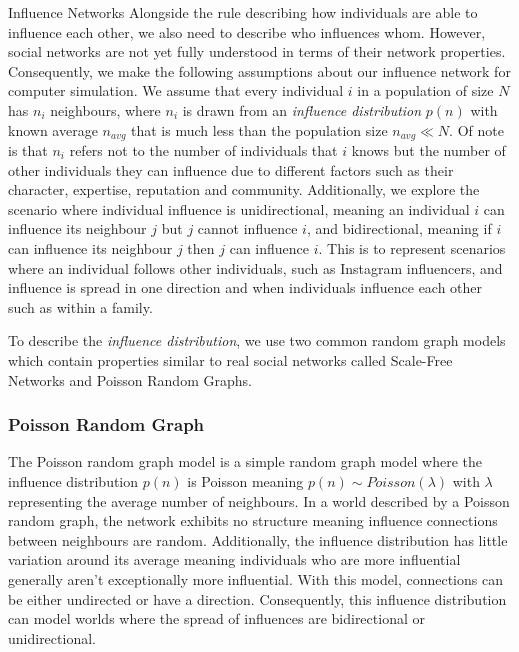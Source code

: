 \documentclass[10pt, oneside, reqno]{amsart}
\makeatletter
\theoremstyle{plain}%
\theoremstyle{definition}
\theoremstyle{remark}
\renewcommand\subsection{\@startsection{subsection}{2}%
  \z@{.5\linespacing\@plus.7\linespacing}{-.5em}%
  {\normalfont\scshape}}
\makeatother
\begin{document}
\subsection{Influence Networks}
Alongside the rule describing how individuals are able to influence each other, we also need to 
describe who influences whom.
However, social networks are not yet fully understood in terms of their network properties. 
Consequently, we make the following assumptions about our influence network for computer 
simulation.
We assume that every individual $i$ in a population of size $N$ has $n_i$ neighbours, where 
$n_i$ is drawn from an \textit{influence distribution} $p(n)$ with known average $n_{avg}$ that is much less 
than the population size $n_{avg} \ll N$.
Of note is that $n_i$ refers not to the number of individuals that $i$ knows but the number of 
other individuals they can influence due to different factors such as their character, expertise, reputation and community.
Additionally, we explore the scenario where individual influence is unidirectional, meaning 
an individual $i$ can influence its neighbour $j$ but $j$ cannot influence $i$, and 
bidirectional, meaning if $i$ can influence its neighbour $j$ then $j$ can influence $i$. 
This is to represent scenarios where an individual follows other individuals, such as Instagram 
influencers, and influence is spread in one direction and when individuals influence each 
other such as within a family.

To describe the \textit{influence distribution}, we use two common random graph models 
which contain properties similar to real social networks called Scale-Free Networks and 
Poisson Random Graphs.


\subsubsection{Poisson Random Graph}
The Poisson random graph model is a simple random graph model where the influence distribution $p(n)$ is Poisson meaning $p(n) \sim Poisson(\lambda)$ with $\lambda$ representing the average number of neighbours. In a world described by a Poisson random graph, the network exhibits no structure meaning influence connections between neighbours are random. 
Additionally, the influence distribution has little variation around its average meaning individuals who are more influential generally aren't exceptionally more influential.
With this model, connections can be either undirected or have a direction.
Consequently, this influence distribution can model worlds where the spread of influences are bidirectional or unidirectional.
\end{document}
